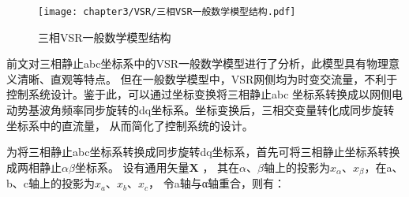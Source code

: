 \begin{figure}[!htp]
	\centering
	\texttt{[image: chapter3/VSR/三相VSR一般数学模型结构.pdf]}
	\caption{三相VSR一般数学模型结构}
	\label{fig:三相VSR一般数学模型结构}
\end{figure}

前文对三相静止abc坐标系中的VSR一般数学模型进行了分析，此模型具有物理意义清晰、直观等特点。
但在一般数学模型中，VSR网侧均为时变交流量，不利于控制系统设计。鉴于此，可以通过坐标变换将三相静止abc
坐标系转换成以网侧电动势基波角频率同步旋转的dq坐标系。坐标变换后，三相交变量转化成同步旋转坐标系中的直流量，
从而简化了控制系统的设计。

为将三相静止abc坐标系转换成同步旋转dq坐标系，首先可将三相静止坐标系转换成两相静止$\alpha\beta$坐标系。
设有通用矢量$\boldsymbol{X}$ ，
其在$\alpha$、$\beta$轴上的投影为$x_{\alpha}$、$x_{\beta}$，在a、b、c轴上的投影为$x_{a}$、$x_{b}$、$x_{c}$，
令a轴与α轴重合，则有：

